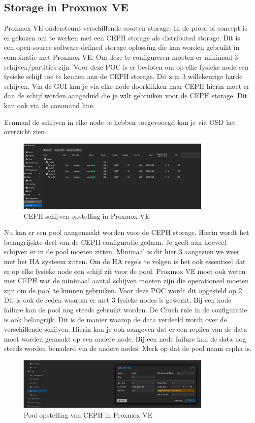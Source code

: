 \subsection{Storage in Proxmox VE}
Proxmox VE ondersteunt verschillende soorten storage. In de proof of concept is er gekozen om te werken met een CEPH storage als distributed storage. Dit is een open-source software-defined storage oplossing die kan worden gebruikt in combinatie met Proxmox VE.
Om deze te configureren moeten er minimaal 3 schijven/partities zijn. Voor deze POC is er besloten om op elke fysieke node een fysieke schijf toe te kennen aan de CEPH storage. Dit zijn 3 willekeurige harde schijven.
Via de GUI kan je via elke node doorklikken naar CEPH hierin moet er dan de schijf worden aangeduid die je wilt gebruiken voor de CEPH storage. Dit kan ook via de command line.

Eenmaal de schijven in elke node te hebben toegevooegd kan je via OSD het overzicht zien.
\begin{figure}[H]
  \centering
  \includegraphics[width=0.85\textwidth]{../poc/ceph-osd-prox.png}
  \caption{CEPH schijven opstelling in Proxmox VE}
  \label{fig:osd-ceph-proxmox}
\end{figure}

Nu kan er een pool aangemaakt worden voor de CEPH storage. Hierin wordt het belangrijskte deel van de CEPH configuratie gedaan.
Je geeft aan hoeveel schijven er in de pool moeten zitten. Minimaal is dit hier 3 aangezien we weer met het HA systeem zitten. Om de HA regels te volgen is het ook essentieel dat er op elke fysieke node een schijf zit voor de pool.
Proxmox VE moet ook weten met CEPH wat de minimaal aantal schijven moeten zijn die operationeel moeten zijn om de pool te kunnen gebruiken. Voor deze POC wordt dit opgesteld op 2. Dit is ook de reden waarom er met 3 fysieke nodes is gewerkt. Bij een node failure kan de pool nog steeds gebruikt worden.
De Crush rule in de configuratie is ook belangrijk. Dit is de manier waarop de data verdeeld wordt over de verschillende schijven. Hierin kan je ook aangeven dat er een replica van de data moet worden gemaakt op een andere node. Bij een node failure kan de data nog steeds worden benaderd via de andere nodes.
Merk op dat de pool naam cepha is.
\begin{figure}[H]
  \centering
  \includegraphics[width=0.85\textwidth]{../poc/ceph-pool-prox.png}
  \caption{Pool opstelling van CEPH in Proxmox VE}
  \label{fig:ceph-pool-prox}
\end{figure}

